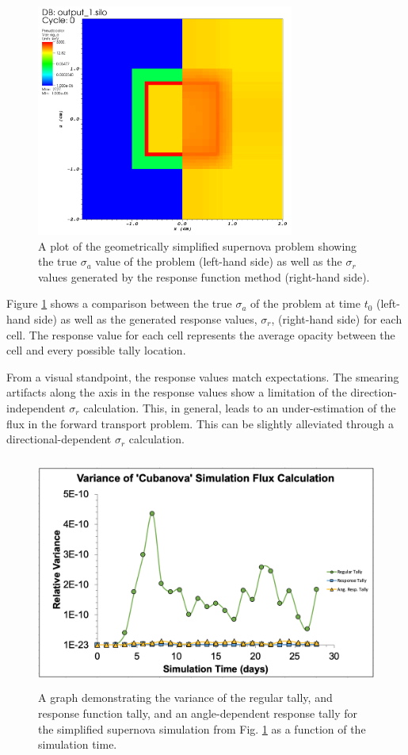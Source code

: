 \begin{figure} [h!]
	\centering
	\includegraphics[height=3in]{VarReduction/plots/cubanova_op_a.png}
	\caption{A plot of the geometrically simplified supernova problem showing the true $\sigma_{a}$ value of the problem (left-hand side) as well as the $\sigma_{r}$ values generated by the response function method (right-hand side).}
	\label{fig:cubanova_op_a}
\end{figure}

Figure \ref{fig:cubanova_op_a} shows a comparison between the true $\sigma_{a}$ of the problem at time $t_{0}$ (left-hand side) as well as the generated response values, $\sigma_{r}$, (right-hand side) for each cell. The response value for each cell represents the average opacity between the cell and every possible tally location. 

From a visual standpoint, the response values match expectations. The smearing artifacts along the axis in the response values show a limitation of the direction-independent $\sigma_{r}$ calculation. This, in general, leads to an under-estimation of the flux in the forward transport problem. This can be slightly alleviated through a directional-dependent $\sigma_{r}$ calculation.

\begin{figure} [h!]
	\centering
	\includegraphics[height=3in]{VarReduction/plots/cubanova_flux_var.png}
	\caption{A graph demonstrating the variance of the regular tally, and response function tally, and an angle-dependent response tally for the simplified supernova simulation from Fig. \ref{fig:cubanova_op_a} as a function of the simulation time.}
	\label{fig:cubanova_flux_var}
\end{figure}

